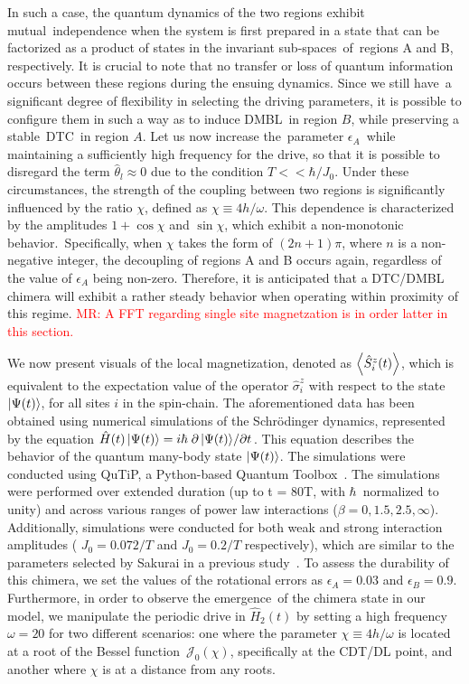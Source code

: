 \documentclass[%
nofootinbib,
reprint,
superscriptaddress,
amsmath,amssymb,showkeys,
aps,
prb,
]{revtex4-2}
\newcommand{\red}[1]{\textcolor{red}{#1}}
\begin{document}
In such a case, the quantum dynamics of the two regions exhibit mutual independence when the system is first prepared in a state that can be factorized as a product of states in the invariant sub-spaces of regions A and B, respectively. It is crucial to note that no transfer or loss of quantum information occurs between these regions during the ensuing dynamics.  Since we still have a significant degree of flexibility in selecting the driving parameters, it is possible to configure them in such a way as to induce DMBL in region $B$, while preserving a stable DTC in region $A$. Let us now increase the parameter $\epsilon_A$ while maintaining a sufficiently high frequency for the drive, so that it is possible to disregard the term $\hat{\theta}_l \approx 0$ due to the condition $T<<\hbar/J_0$. Under these circumstances, the strength of the coupling between two regions is significantly influenced by the ratio $\chi$, defined as $\chi\equiv 4h/\omega$. This dependence is characterized by the amplitudes $1+\cos{\chi}$ and $\sin{\chi}$, which exhibit a non-monotonic behavior. Specifically, when $\chi$ takes the form of $(2n+1)\pi$, where $n$ is a non-negative integer, the decoupling of regions A and B occurs again, regardless of the value of $\epsilon_A$ being non-zero. Therefore, it is anticipated that a DTC/DMBL chimera will exhibit a rather steady behavior when operating within proximity of this regime. 
\red{MR: A FFT regarding single site magnetzation is in order latter in this section.}

	
We now present visuals of the local magnetization, denoted as $\expval{\hat{S}^z_i (t)}$, which is equivalent to the expectation value of the operator $\hat{\sigma}^z_i$ with respect to the state $\ket{\Psi(t)}$, for all sites $i$ in the spin-chain. The aforementioned data has been obtained using numerical simulations of the Schr\"odinger dynamics, represented by the equation $\hat{H}(t)\ket{\Psi(t)}= i \hbar \pdv*{\ket{\Psi(t)}}{t}$. This equation describes the behavior of the quantum many-body state $\ket{\Psi(t)}$. The simulations were conducted using QuTiP, a Python-based Quantum Toolbox~\cite{Johansson2013}. The simulations were performed over extended duration (up to t = 80T, with $\hbar$ normalized to unity) and across various ranges of power law interactions ($\beta = 0,1.5,2.5,\infty$). Additionally, simulations were conducted for both weak and strong interaction amplitudes ( $J_0 = 0.072/T$ and $J_0 = 0.2/T$ respectively), which are similar to the parameters selected by Sakurai in a previous study~\cite{sakurai_phys_nodate}. To assess the durability of this chimera, we set the values of the rotational errors as $\epsilon_A = 0.03$ and $\epsilon_B = 0.9$. Furthermore, in order to observe the emergence of the chimera state in our model, we manipulate the periodic drive in $\hat{H}_2(t)$ by setting a high frequency $\omega=20$ for two different scenarios: one where the parameter $\chi\equiv4h/\omega$ is located at a root of the Bessel function $\mathcal{J}_0(\chi)$, specifically at the CDT/DL point, and another where $\chi$ is at a distance from any roots.
		
\end{document}
